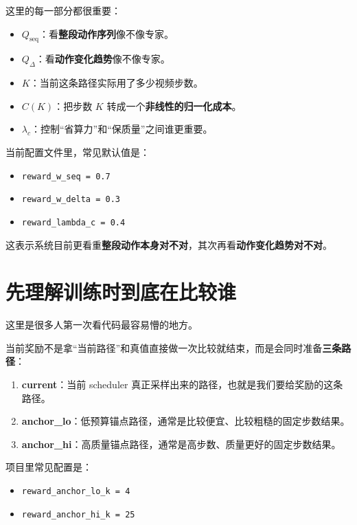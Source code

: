 \documentclass[12pt]{ctexart}
\begin{document}
这里的每一部分都很重要：

\begin{itemize}
    \item $Q_{\text{seq}}$：看\textbf{整段动作序列}像不像专家。
    \item $Q_{\Delta}$：看\textbf{动作变化趋势}像不像专家。
    \item $K$：当前这条路径实际用了多少视频步数。
    \item $C(K)$：把步数 $K$ 转成一个\textbf{非线性的归一化成本}。
    \item $\lambda_c$：控制“省算力”和“保质量”之间谁更重要。
\end{itemize}

当前配置文件里，常见默认值是：

\begin{itemize}
    \item \texttt{reward\_w\_seq = 0.7}
    \item \texttt{reward\_w\_delta = 0.3}
    \item \texttt{reward\_lambda\_c = 0.4}
\end{itemize}

这表示系统目前更看重\textbf{整段动作本身对不对}，其次再看\textbf{动作变化趋势对不对}。

\section{先理解训练时到底在比较谁}

这里是很多人第一次看代码最容易懵的地方。

当前奖励不是拿“当前路径”和真值直接做一次比较就结束，而是会同时准备\textbf{三条路径}：

\begin{enumerate}
    \item \textbf{current}：当前 scheduler 真正采样出来的路径，也就是我们要给奖励的这条路径。
    \item \textbf{anchor\_lo}：低预算锚点路径，通常是比较便宜、比较粗糙的固定步数结果。
    \item \textbf{anchor\_hi}：高质量锚点路径，通常是高步数、质量更好的固定步数结果。
\end{enumerate}

项目里常见配置是：

\begin{itemize}
    \item \texttt{reward\_anchor\_lo\_k = 4}
    \item \texttt{reward\_anchor\_hi\_k = 25}
\end{itemize}
\end{document}
